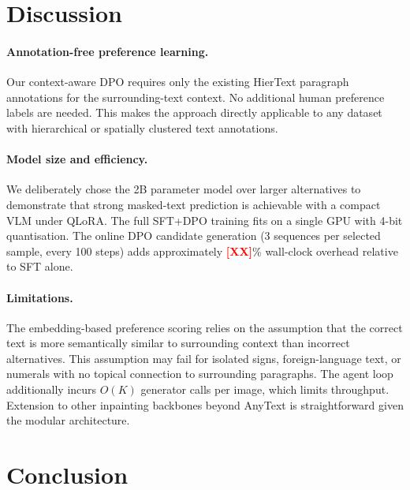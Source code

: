\documentclass[uplatex,10pt,twocolumn,a4paper]{article}
\newcommand{\TODO}[1]{\textcolor{red}{\textbf{[#1]}}}
\begin{document}
\section{Discussion}
\label{sec:discussion}

\paragraph{Annotation-free preference learning.}
Our context-aware DPO requires only the existing HierText paragraph
annotations for the surrounding-text context.
No additional human preference labels are needed.
This makes the approach directly applicable to any dataset with
hierarchical or spatially clustered text annotations.

\paragraph{Model size and efficiency.}
We deliberately chose the 2B parameter model over larger alternatives
to demonstrate that strong masked-text prediction is achievable with a
compact VLM under QLoRA.
The full SFT+DPO training fits on a single GPU with 4-bit
quantisation.
The online DPO candidate generation (3 sequences per selected sample,
every 100 steps) adds approximately \TODO{XX}\% wall-clock overhead
relative to SFT alone.

\paragraph{Limitations.}
The embedding-based preference scoring relies on the assumption that
the correct text is more semantically similar to surrounding context
than incorrect alternatives.
This assumption may fail for isolated signs, foreign-language text, or
numerals with no topical connection to surrounding paragraphs.
The agent loop additionally incurs $O(K)$ generator calls per image,
which limits throughput.
Extension to other inpainting backbones beyond AnyText is
straightforward given the modular architecture.

\section{Conclusion}
\label{sec:conclusion}
\end{document}
